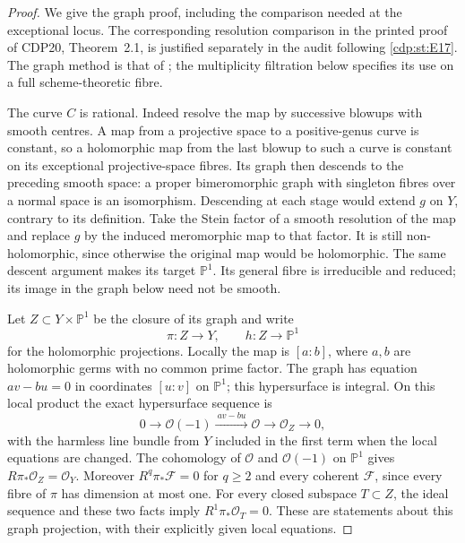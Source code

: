 \begin{proof}
We give the graph proof, including the comparison needed at the
exceptional locus. The corresponding resolution comparison in the
printed proof of CDP20, Theorem~2.1, is justified separately in the
audit following \ref{cdp:st:E17}. The graph method is that of \citet[Theorem~3.1, p.~9]{LRS2019}; the multiplicity filtration below specifies its use on a full
scheme-theoretic fibre.

The curve $C$ is rational. Indeed resolve the map by successive blowups
with smooth centres. A map from a projective space to a positive-genus
curve is constant, so a holomorphic map from the last blowup to such a
curve is constant on its exceptional projective-space fibres. Its graph
then descends to the preceding smooth space: a proper bimeromorphic
graph with singleton fibres over a normal space is an isomorphism.
Descending at each stage would extend $g$ on $Y$, contrary to its
definition. Take the Stein factor of a smooth resolution of the map
and replace $g$ by the induced meromorphic map to that factor. It
is still non-holomorphic, since otherwise the original map would
be holomorphic. The same descent argument makes its target
$\mathbb P^1$. Its general fibre is irreducible and reduced;
its image in the graph below need not be smooth.

Let $Z\subset Y\times\mathbb P^1$ be the closure of its graph and write
\[
 \pi:Z\to Y,\qquad h:Z\to\mathbb P^1
\]
for the holomorphic projections. Locally the map is $[a:b]$, where
$a,b$ are holomorphic germs with no common prime factor. The graph has
equation $av-bu=0$ in coordinates $[u:v]$ on $\mathbb P^1$; this
hypersurface is integral. On this local product the exact hypersurface
sequence is
\[
 0\to\mathcal O(-1)\xrightarrow{\ av-bu\ }\mathcal O
 \to\mathcal O_Z\to0,
\]
with the harmless line bundle from $Y$ included in the first term when
the local equations are changed. The cohomology of $\mathcal O$ and
$\mathcal O(-1)$ on $\mathbb P^1$ gives
$R\pi_*\mathcal O_Z=\mathcal O_Y$. Moreover $R^q\pi_*\mathcal F=0$
for $q\geq2$ and every coherent $\mathcal F$, since every fibre of
$\pi$ has dimension at most one. For every closed subspace $T\subset Z$,
the ideal sequence and these two facts imply
$R^1\pi_*\mathcal O_T=0$. These are statements about this graph
projection, with their explicitly given local equations.


\end{proof}
